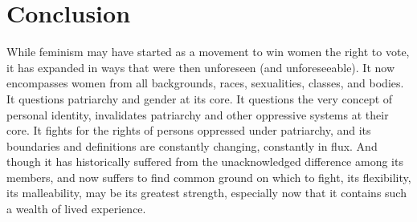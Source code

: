 \documentclass[man,12pt,natbib]{apa6}
\begin{document}
\section{Conclusion}

While feminism may have started as a movement to win women the right to vote,
it has expanded in ways that were then unforeseen (and unforeseeable). It now
encompasses women from all backgrounds, races, sexualities, classes, and
bodies. It questions patriarchy and gender at its core. It questions the very
concept of personal identity, invalidates patriarchy and other oppressive
systems at their core. It fights for the rights of persons oppressed under
patriarchy, and its boundaries and definitions are constantly changing,
constantly in flux. And though it has historically suffered from the
unacknowledged difference among its members, and now suffers to find common
ground on which to fight, its flexibility, its malleability, may be its
greatest strength, especially now that it contains such a wealth of lived
experience.

\clearpage

\end{document}
